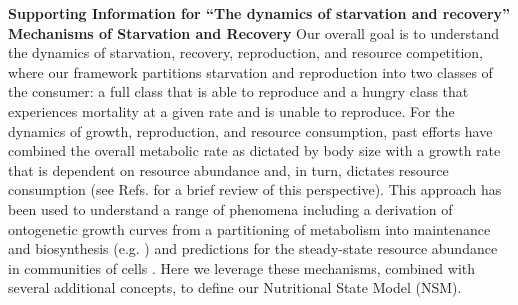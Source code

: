 \documentclass[twocolumn,preprintnumbers,amsmath,amssymb,superscriptaddress]{revtex4}
\begin{document}
\begin{bibunit}[unsrt]
{\bf Supporting Information for ``The dynamics of starvation and recovery''}\\

{\bf Mechanisms of Starvation and Recovery}
Our overall goal is to understand the dynamics of starvation, recovery, reproduction, and resource competition, where our framework partitions starvation and reproduction into two classes of the consumer: a full class that is able to reproduce and a hungry class that experiences mortality at a given rate and is unable to reproduce. For the dynamics of growth, reproduction, and resource consumption, past efforts have combined the overall metabolic rate as dictated by body size with a growth rate that is dependent on resource abundance and, in turn, dictates resource consumption (see Refs. \citep{Kempes:2012hy,kempes2014morphological} for a brief review of this perspective). This approach has been used to understand a range of phenomena including a derivation of ontogenetic growth curves from a partitioning of metabolism into maintenance and biosynthesis (e.g. \citep{West:2001bv,moses2008rmo,hou,Kempes:2012hy}) and predictions for the steady-state resource abundance in communities of cells \citep{kempes2014morphological}. Here we leverage these mechanisms, combined with several additional concepts, to define our Nutritional State Model (NSM).


\end{bibunit}
\end{document}
